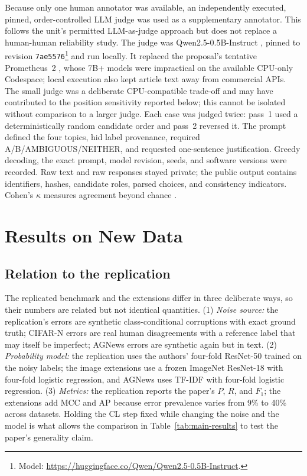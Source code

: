 \documentclass[11pt]{article}
\begin{document}
Because only one human annotator was available, an independently executed,
pinned, order-controlled LLM judge was used as a supplementary annotator. This
follows the unit's permitted LLM-as-judge approach but does not replace a
human-human reliability study. The judge was Qwen2.5-0.5B-Instruct
\citep{qwen2024qwen25}, pinned to revision \texttt{7ae5576}\footnote{Model:
\url{https://huggingface.co/Qwen/Qwen2.5-0.5B-Instruct}.} and run locally.
It replaced the proposal's tentative Prometheus~2 \citep{kim2024prometheus},
whose 7B+ models were impractical on the available CPU-only Codespace; local
execution also kept article text away from commercial APIs. The small judge
was a deliberate CPU-compatible trade-off and may have contributed to the
position sensitivity reported below; this cannot be isolated without
comparison to a larger judge. Each case was judged twice: pass~1 used a
deterministically random candidate order and pass~2 reversed it. The prompt
defined the four topics, hid label provenance, required A/B/AMBIGUOUS/NEITHER,
and requested one-sentence justification. Greedy decoding, the exact prompt,
model revision, seeds, and software versions were recorded. Raw text and raw
responses stayed private; the public output contains identifiers, hashes,
candidate roles, parsed choices, and consistency indicators. Cohen's $\kappa$
measures agreement beyond chance \citep{cohen1960coefficient}.

\section{Results on New Data}
\label{sec:results}

\subsection{Relation to the replication}

The replicated benchmark and the extensions differ in three deliberate ways,
so their numbers are related but not identical quantities. (1) \emph{Noise
source:} the replication's errors are synthetic class-conditional
corruptions with exact ground truth; CIFAR-N errors are real human
disagreements with a reference label that may itself be imperfect; AGNews
errors are synthetic again but in text. (2) \emph{Probability model:} the
replication uses the authors' four-fold ResNet-50 trained on the noisy
labels; the image extensions use a frozen ImageNet ResNet-18 with four-fold
logistic regression, and AGNews uses TF-IDF with four-fold logistic
regression. (3) \emph{Metrics:} the replication reports the paper's $P$,
$R$, and $F_1$; the extensions add MCC and AP because error prevalence
varies from 9\% to 40\% across datasets. Holding the CL step fixed while
changing the noise and the model is what allows the comparison in
Table~\ref{tab:main-results} to test the paper's generality claim.
\end{document}
